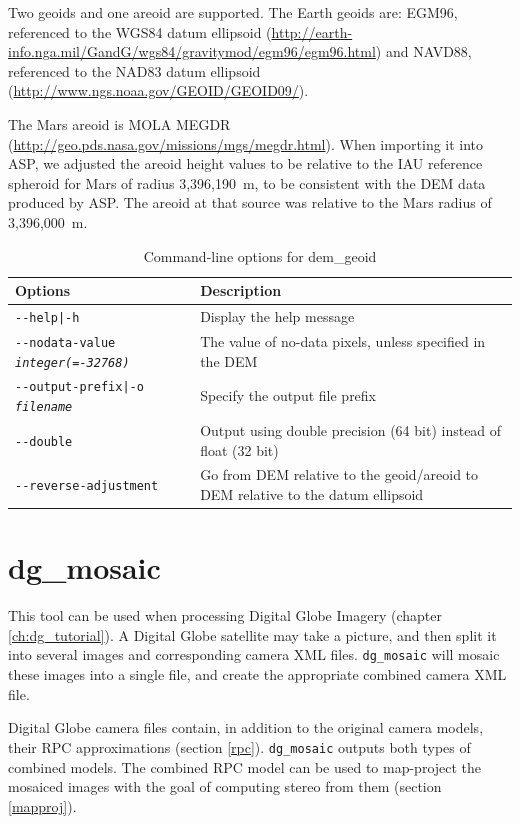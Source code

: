 Two geoids and one areoid are supported. The Earth geoids are: EGM96, referenced to the WGS84 datum ellipsoid (\url{http://earth-info.nga.mil/GandG/wgs84/gravitymod/egm96/egm96.html})
and NAVD88, referenced to the NAD83 datum ellipsoid (\url{http://www.ngs.noaa.gov/GEOID/GEOID09/}).

The Mars areoid is MOLA MEGDR
(\url{http://geo.pds.nasa.gov/missions/mgs/megdr.html}). When importing
it into ASP, we adjusted the areoid height values to be relative to
the IAU reference spheroid for Mars of radius 3,396,190~m, to be
consistent with the DEM data produced by ASP. The areoid at that source was
relative to the Mars radius of 3,396,000~m.

\begin{longtable}{|l|p{10cm}|}
\caption{Command-line options for dem\_geoid}
\label{tbl:demgeoid}
\endfirsthead
\endhead
\endfoot
\endlastfoot
\hline
Options & Description \\ \hline \hline
\texttt{-\/-help|-h} & Display the help message\\ \hline
\texttt{-\/-nodata-value \textit{integer(=-32768)}} & The value of no-data pixels, unless specified in the DEM \\ \hline
\texttt{-\/-output-prefix|-o \textit{filename}} & Specify the output file prefix \\ \hline
\texttt{-\/-double} & Output using double precision (64 bit) instead of float (32 bit)\\ \hline
\texttt{-\/-reverse-adjustment} & Go from DEM relative to the geoid/areoid to DEM relative to the datum ellipsoid\\ \hline
\end{longtable}

\section{dg\_mosaic}
\label{dgmosaic}

This tool can be used when processing Digital Globe Imagery (chapter
\ref{ch:dg_tutorial}). A Digital Globe satellite may take a
picture, and then split it into several images and corresponding camera
XML files. \texttt{dg\_mosaic} will mosaic these images into a single
file, and create the appropriate combined camera XML file.

Digital Globe camera files contain, in addition to the original camera
models, their RPC approximations (section
\ref{rpc}). \texttt{dg\_mosaic} outputs both types of combined
models. The combined RPC model can be used to map-project the mosaiced
images with the goal of computing stereo from them (section
\ref{mapproj}).

